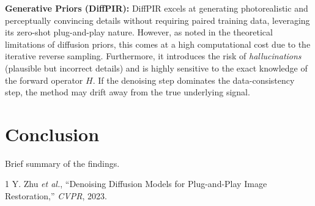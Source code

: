 \documentclass[10pt,journal,compsoc]{IEEEtran}
\begin{document}
\textbf{Generative Priors (DiffPIR):} DiffPIR excels at generating photorealistic and perceptually convincing details without requiring paired training data, leveraging its zero-shot plug-and-play nature. However, as noted in the theoretical limitations of diffusion priors, this comes at a high computational cost due to the iterative reverse sampling. Furthermore, it introduces the risk of \textit{hallucinations} (plausible but incorrect details) and is highly sensitive to the exact knowledge of the forward operator $H$. If the denoising step dominates the data-consistency step, the method may drift away from the true underlying signal.

\section{Conclusion}
Brief summary of the findings.


\begin{thebibliography}{1}
Y. Zhu \emph{et al.}, ``Denoising Diffusion Models for Plug-and-Play Image Restoration,'' \emph{CVPR}, 2023.
\end{thebibliography}
\end{document}

